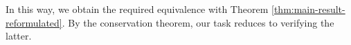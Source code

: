 

In this way, we obtain the required equivalence with Theorem \ref{thm:main-result-reformulated}.  By the conservation theorem, our task reduces to verifying the latter.

